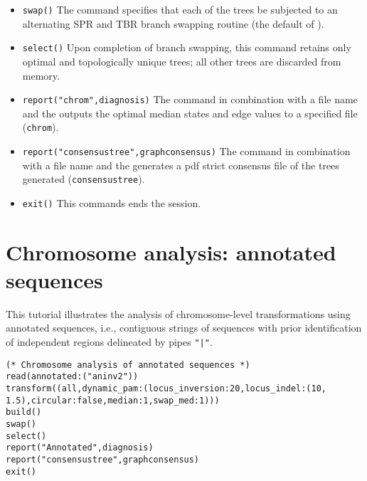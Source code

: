 \begin{itemize}
\item \texttt{swap()} The  command specifies that each of the trees be subjected to an alternating SPR and TBR branch swapping routine (the default of \poy).
\item \texttt{select()} Upon completion of branch swapping, this command retains only optimal and topologically unique trees; all other trees are discarded from memory. 
\item \texttt{report("chrom",diagnosis)}  The  command in combination with a file name and the  outputs the optimal median states and edge values to a specified file (\texttt{chrom}). 
\item \texttt{report("consensustree",graphconsensus)}  The  command in combination with a file name and the  generates a pdf strict consensus file of the trees generated (\texttt{consensustree}). 
\item \texttt{exit()} This commands ends the \poy session.
\end{itemize}

\section{Chromosome analysis: annotated sequences}{\label{tutorial4.7}}

This tutorial illustrates the analysis of chromosome-level transformations using 
annotated sequences, i.e., contiguous strings of sequences with prior 
identification of independent regions delineated by pipes  \texttt{"|"}. 

\begin{verbatim}
(* Chromosome analysis of annotated sequences *)
read(annotated:("aninv2"))
transform((all,dynamic_pam:(locus_inversion:20,locus_indel:(10,
1.5),circular:false,median:1,swap_med:1)))
build()
swap()
select()
report("Annotated",diagnosis)
report("consensustree",graphconsensus)
exit()
\end{verbatim}


